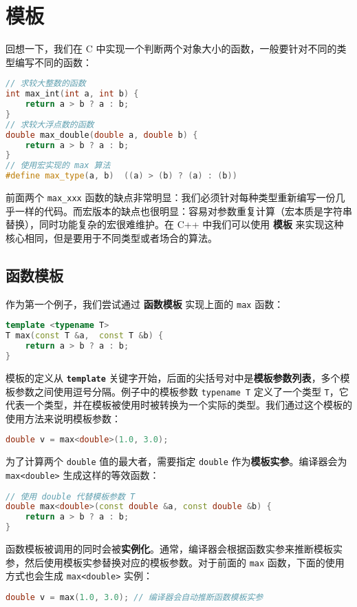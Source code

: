 \section{模板}

回想一下，我们在 C 中实现一个判断两个对象大小的函数，一般要针对不同的类型编写不同的函数：
\begin{lstlisting}[language=c++]
// 求较大整数的函数
int max_int(int a, int b) {
    return a > b ? a : b;
}
// 求较大浮点数的函数
double max_double(double a, double b) {
    return a > b ? a : b;
}
// 使用宏实现的 max 算法
#define max_type(a, b)  ((a) > (b) ? (a) : (b))
\end{lstlisting}
前面两个 \texttt{max\_xxx} 函数的缺点非常明显：我们必须针对每种类型重新编写一份几乎一样的代码。而宏版本的缺点也很明显：容易对参数重复计算（宏本质是字符串替换），同时功能复杂的宏很难维护。在 C++ 中我们可以使用 \textbf{模板} 来实现这种核心相同，但是要用于不同类型或者场合的算法。

\subsection{函数模板}

作为第一个例子，我们尝试通过 \textbf{函数模板} 实现上面的 \texttt{max} 函数：
\begin{lstlisting}[language=c++]
template <typename T>
T max(const T &a,  const T &b) {
    return a > b ? a : b;
}
\end{lstlisting}
模板的定义从 \textbf{\texttt{template}} 关键字开始，后面的尖括号对中是\textbf{模板参数列表}，多个模板参数之间使用逗号分隔。例子中的模板参数 \texttt{typename T} 定义了一个类型 \texttt{T}，它代表一个类型，并在模板被使用时被转换为一个实际的类型。我们通过这个模板的使用方法来说明模板参数：
\begin{lstlisting}[language=c++,numbers=none]
double v = max<double>(1.0, 3.0);
\end{lstlisting}
为了计算两个 \texttt{double} 值的最大者，需要指定 \texttt{double} 作为\textbf{模板实参}。编译器会为 \texttt{max<double>} 生成这样的等效函数：
\begin{lstlisting}[language=c++]
// 使用 double 代替模板参数 T
double max<double>(const double &a, const double &b) {
    return a > b ? a : b;
}
\end{lstlisting}
函数模板被调用的同时会被\textbf{实例化}。通常，编译器会根据函数实参来推断模板实参，然后使用模板实参替换对应的模板参数。对于前面的 \texttt{max} 函数，下面的使用方式也会生成 \texttt{max<double>} 实例：
\begin{lstlisting}[language=c++,numbers=none]
double v = max(1.0, 3.0); // 编译器会自动推断函数模板实参
\end{lstlisting}

